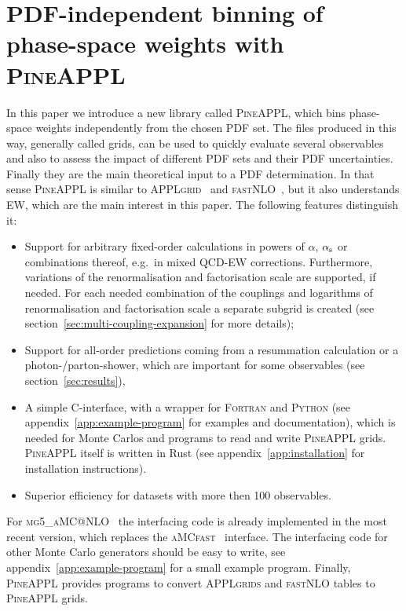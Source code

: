 \section{PDF-independent binning of phase-space weights with \texorpdfstring{\textsc{PineAPPL}}{PineAPPL}}
\label{sec:pineappl}

In this paper we introduce a new library called \textsc{PineAPPL}, which bins phase-space weights independently from the chosen PDF set.
The files produced in this way, generally called grids, can be used to quickly evaluate several observables and also to assess the impact of different PDF sets and their PDF uncertainties.
Finally they are the main theoretical input to a PDF determination.
In that sense \textsc{PineAPPL} is similar to \textsc{APPLgrid}~\cite{Carli:2010rw} and \textsc{fastNLO}~\cite{Kluge:2006xs,Wobisch:2011ij,Britzger:2012bs}, but it also understands EW, which are the main interest in this paper.
The following features distinguish it:
\begin{itemize}
\item Support for arbitrary fixed-order calculations in powers of $\alpha$, $\alpha_\mathrm{s}$ or combinations thereof, e.g.\ in mixed QCD-EW corrections.
Furthermore, variations of the renormalisation and factorisation scale are supported, if needed.
For each needed combination of the couplings and logarithms of renormalisation and factorisation scale a separate subgrid is created (see section~\ref{sec:multi-coupling-expansion} for more details);
\item Support for all-order predictions coming from a resummation calculation or a photon-/parton-shower, which are important for some observables (see section~\ref{sec:results}),
\item A simple \textsc{C}-interface, with a wrapper for \textsc{Fortran} and \textsc{Python} (see appendix~\ref{app:example-program} for examples and documentation), which is needed for Monte Carlos and programs to read and write \textsc{PineAPPL} grids.
\textsc{PineAPPL} itself is written in Rust (see appendix~\ref{app:installation} for installation instructions).
\item Superior efficiency for datasets with more then 100 observables.
\end{itemize}
For \textsc{mg5\_aMC@NLO}~\cite{Alwall:2014hca,Frederix:2018nkq} the interfacing code is already implemented in the most recent version, which replaces the \textsc{aMCfast}~\cite{Bertone:2014zva} interface.
The interfacing code for other Monte Carlo generators should be easy to write, see appendix~\ref{app:example-program} for a small example program.
Finally, \textsc{PineAPPL} provides programs to convert \textsc{APPLgrids} and \textsc{fastNLO} tables to \textsc{PineAPPL} grids.

